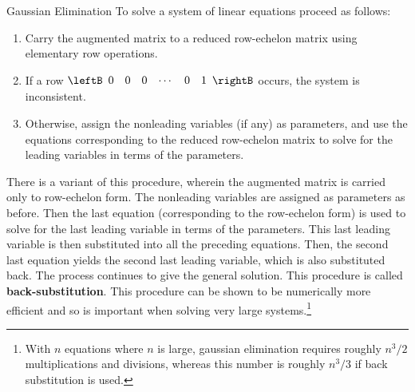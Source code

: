 \begin{theorem*}[label=thm:001084]{Gaussian Elimination}
To solve a system of linear equations proceed as follows:

\begin{enumerate}
\item Carry the augmented matrix to a reduced row-echelon matrix using elementary row operations.

\item If a row $\leftB \begin{array}{cccccc}
0 & 0 & 0 & \cdots & 0 & 1
\end{array} \rightB$ occurs, the system is inconsistent.

\item Otherwise, assign the nonleading variables (if any) as parameters, and use the equations corresponding to the reduced row-echelon matrix to solve for the leading variables in terms of the parameters.

\end{enumerate}
\end{theorem*}

There is a variant of this procedure, wherein the augmented matrix is carried only to row-echelon form. The nonleading variables are assigned as parameters as before. Then the last equation (corresponding to the row-echelon form) is used to solve for the last leading variable in terms of the parameters. This last leading variable is then substituted into all the preceding equations. Then, the second last equation yields the second last leading variable, which is also substituted back. The process continues to give the general solution. This procedure is called \textbf{back-substitution}. This procedure can be shown to be numerically more efficient and so is important when solving very large systems.\footnote{With $n$ equations where $n$ is large, gaussian elimination requires roughly $n^3/2$ multiplications and divisions, whereas this number is roughly $n^3/3$ if back substitution is used.}

